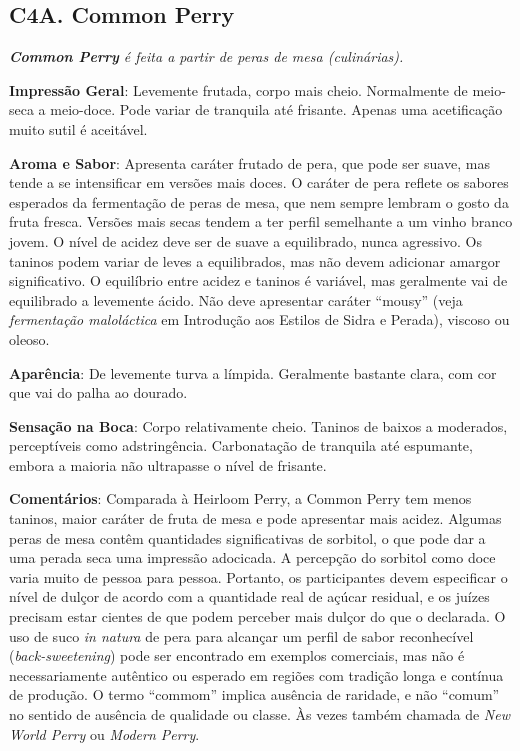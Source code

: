 \subsection*{C4A. Common Perry}

\textit{\textbf{Common Perry} é feita a partir de peras de mesa (culinárias).}

\textbf{Impressão Geral}: Levemente frutada, corpo mais cheio. Normalmente de meio-seca a meio-doce. Pode variar de tranquila até frisante. Apenas uma acetificação muito sutil é aceitável.

\textbf{Aroma e Sabor}: Apresenta caráter frutado de pera, que pode ser suave, mas tende a se intensificar em versões mais doces. O caráter de pera reflete os sabores esperados da fermentação de peras de mesa, que nem sempre lembram o gosto da fruta fresca. Versões mais secas tendem a ter perfil semelhante a um vinho branco jovem. O nível de acidez deve ser de suave a equilibrado, nunca agressivo. Os taninos podem variar de leves a equilibrados, mas não devem adicionar amargor significativo. O equilíbrio entre acidez e taninos é variável, mas geralmente vai de equilibrado a levemente ácido. Não deve apresentar caráter “mousy” (veja \textit{fermentação maloláctica} em Introdução aos Estilos de Sidra e Perada), viscoso ou oleoso.

\textbf{Aparência}: De levemente turva a límpida. Geralmente bastante clara, com cor que vai do palha ao dourado.

\textbf{Sensação na Boca}: Corpo relativamente cheio. Taninos de baixos a moderados, perceptíveis como adstringência. Carbonatação de tranquila até espumante, embora a maioria não ultrapasse o nível de frisante.

\textbf{Comentários}: Comparada à Heirloom Perry, a Common Perry tem menos taninos, maior caráter de fruta de mesa e pode apresentar mais acidez. Algumas peras de mesa contêm quantidades significativas de sorbitol, o que pode dar a uma perada seca uma impressão adocicada. A percepção do sorbitol como doce varia muito de pessoa para pessoa. Portanto, os participantes devem especificar o nível de dulçor de acordo com a quantidade real de açúcar residual, e os juízes precisam estar cientes de que podem perceber mais dulçor do que o declarada. O uso de suco \textit{in natura} de pera para alcançar um perfil de sabor reconhecível (\textit{back-sweetening}) pode ser encontrado em exemplos comerciais, mas não é necessariamente autêntico ou esperado em regiões com tradição longa e contínua de produção. O termo “commom” implica ausência de raridade, e não “comum” no sentido de ausência de qualidade ou classe. Às vezes também chamada de \textit{New World Perry} ou \textit{Modern Perry}.

